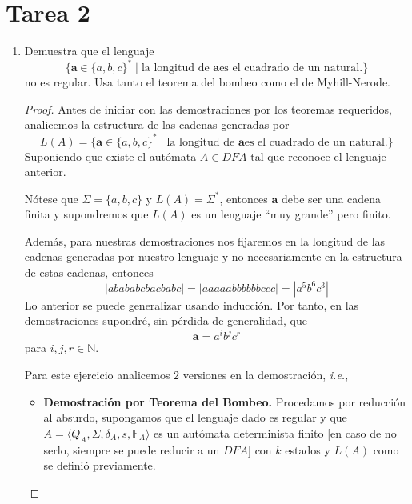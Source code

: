 \documentclass{article}
\begin{document}
\section*{\LARGE{Tarea 2}}
\begin{enumerate}
\item Demuestra que el lenguaje
  \[
  \{\mathbf{a} \in \{a, b, c\}^{*}\; |\; \text{la longitud de $\mathbf{a}$
    es el cuadrado de un natural.}\}
  \]
  no es regular. Usa tanto el teorema del bombeo como el de
  Myhill-Nerode.
  \begin{proof} Antes de iniciar con las demostraciones por los
    teoremas requeridos, analicemos la estructura de las cadenas
    generadas por
    \[
    L(A) = \{\mathbf{a} \in \{a, b, c\}^{*}\; |\; \text{la longitud de $\mathbf{a}$
    es el cuadrado de un natural.}\}
    \]
    Suponiendo que existe el autómata $A \in DFA$ tal que reconoce el lenguaje anterior.
    
    Nótese que $\Sigma = \{a,b,c\}$ y $L(A) = \Sigma^{*}$, entonces $\mathbf{a}$ debe
    ser una cadena finita y supondremos que $L(A)$ es un lenguaje ``muy grande'' pero
    finito.
    
    Además, para nuestras demostraciones nos fijaremos en la longitud de las cadenas
    generadas por nuestro lenguaje y no necesariamente en la estructura de estas
    cadenas, entonces
    \[
    |abababcbacbabc| = |aaaaabbbbbbccc| = |a^{5}b^{6}c^{3}|
    \]
    Lo anterior se puede generalizar usando inducción. Por tanto, en las demostraciones
    supondré, sin pérdida de generalidad, que
    \[
    \mathbf{a} = a^{i}b^{j}c^{r}
    \]
    para $i,j,r \in \mathbb{N}$.
    \begin{center}
    \end{center}
    Para este ejercicio analicemos $2$ versiones en la
    demostración, \textit{i.e.},
    \newcommand{\localtextbulletone}{\textcolor{black}{\raisebox{.45ex}{\rule{.6ex}{.6ex}}}}
    \renewcommand{\labelitemi}{\localtextbulletone}
    \begin{itemize}
    \item \textbf{Demostración por Teorema del Bombeo.} Procedamos por reducción al absurdo,
      supongamos que el lenguaje dado es regular y que $A = \langle Q_{A}, \Sigma, \delta_{A},
      s, \mathbb{F}_{A} \rangle$ es un autómata determinista finito [en caso de no serlo,
        siempre se puede reducir a un $DFA$] con $k$ estados y $L(A)$ como se definió previamente.
      

\end{itemize}
\end{proof}
\end{enumerate}
\end{document}
